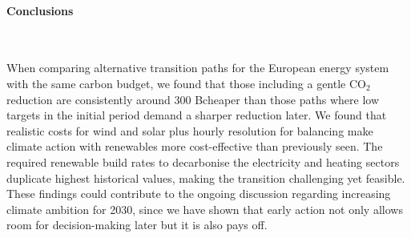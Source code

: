 \documentclass[5p]{elsarticle} %
\begin{document}
\paragraph{\textbf{Conclusions}} \

When comparing alternative transition paths for the European energy system with the same carbon budget, we found that those including a gentle CO$_2$ reduction are consistently around 300 B\EUR cheaper than those paths where low targets in the initial period demand a sharper reduction later.  We found that realistic costs for wind and solar plus hourly resolution for balancing make climate action with renewables more cost-effective than previously seen. The required renewable build rates to decarbonise the electricity and heating sectors duplicate highest historical values, making the transition challenging yet feasible. These findings could contribute to the ongoing discussion regarding increasing climate ambition for 2030, since we have shown that early action not only allows room for decision-making later but it is also pays off.  


\end{document}
